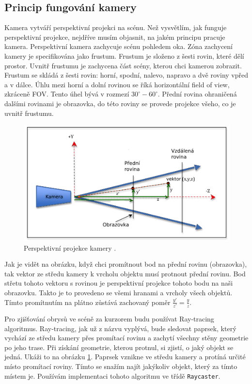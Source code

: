 \documentclass[czech,bachelor,dept420,male,cpdeclaration]{diploma}
\begin{document}
\subsection{Princip fungování kamery}\label{secref:secref16}
Kamera vytváří perspektivní projekci na scénu. Než vysvětlím, jak funguje perspektivní projekce, nejdříve musím objasnit, na jakém principu pracuje kamera. Perspektivní kamera zachycuje scénu pohledem oka. Zóna zachycení kamery je specifikována jako frustum. Frustum je složeno z šesti rovin, které dělí prostor. Uvnitř frustumu je zachycena část scény, kterou chci kamerou zobrazit. Frustum se skládá z šesti rovin: horní, spodní, nalevo, napravo a dvě roviny vpřed a v dálce. Úhlu mezi horní a dolní rovinou se říká horizontální field of view, zkráceně FOV. Tento úhel bývá v rozmezí $30^\circ-60^\circ$. Přední rovina ohraničená dalšími rovinami je obrazovka, do této roviny se provede projekce všeho, co je uvnitř frustumu. 

\begin{figure}[H]
\centering
\includegraphics[width=\linewidth]{Figures/perspectiveProjection.png}
\caption{Perspektivní projekce kamery \cite{learnwebgl}. }
\label{fig:perspectiveProjection}
\end{figure} 

Jak je vidět na obrázku, když chci promítnout bod na přední rovinu (obrazovka), tak vektor ze středu kamery k vrcholu objektu musí protnout přední rovinu. Bod střetu tohoto vektoru s rovinou je perspektivní projekce tohoto bodu na naši obrazovku. Takto je to provedeno se všemi hranami a vrcholy všech objektů. Tímto promítnutím na plátno zůstává zachovaný poměr $\frac{y'}{z'}=\frac{y}{z}$. 


Pro zjišťování obrysů ve scéně za kurzorem budu používat Ray-tracing algoritmus. Ray-tracing, jak už z názvu vyplývá, bude sledovat paprsek, který vychází ze středu kamery přes promítací rovinu a zachytí všechny stěny geometrie po jeho trase. Při získání geometrie, kterou protnul, si zjistí, o jaký objekt se jedná. Ukáži to na obrázku \ref{fig:perspectiveProjection}. Paprsek vznikne ve středu kamery a protíná určité místo promítací roviny. Tímto se snažím najít jakýkoliv objekt, který za tímto místem je. Používám implementaci tohoto algoritmu ve třídě \texttt{Raycaster}.
\end{document}

